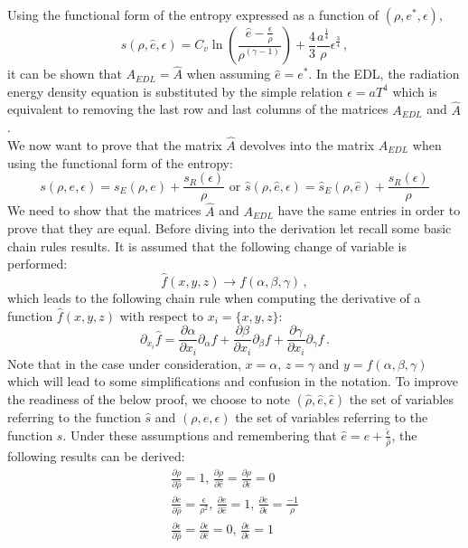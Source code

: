 \documentclass[times,doublespace]{fldauth}%
\begin{document}
Using the functional form of the entropy expressed as a function of $(\rho, e^*, \epsilon)$, 
%
\begin{equation}
s(\rho, \hat{e}, \epsilon) = C_v \ln \left( \frac{\hat{e}-\frac{\epsilon}{\rho}}{\rho^(\gamma-1)} \right) + \frac{4}{3} \frac{a^\frac{1}{4}}{\rho} \epsilon^\frac{3}{4} \, ,
\end{equation}
%
it can be shown that $A_{EDL} = \hat{A}$ when assuming $\hat{e} = e^*$. In the EDL, the radiation energy density equation is substituted by the simple relation $\epsilon = a T^4$ which is equivalent to removing the last row and last columns of the matrices $A_{EDL}$ and $\hat{A}$.\\
%
We now want to prove that the matrix $\hat{A}$ devolves into the matrix $A_{EDL}$ when using the functional form of the entropy:
%
\begin{equation}
s(\rho,e ,\epsilon) = s_E ( \rho ,e) + \frac{s_R(\epsilon)}{\rho} \text{ or }  \hat{s}(\rho,\hat{e} ,\epsilon) = \hat{s}_E ( \rho ,\hat{e}) + \frac{s_R(\epsilon)}{\rho}
\end{equation}
%
We need to show that the matrices $\hat{A}$ and $A_{EDL}$ have the same entries in order to prove that they are equal. Before diving into the derivation let recall some basic chain rules results. It is assumed that the following change of variable is performed:
%
\begin{equation}
\hat{f}(x,y,z) \rightarrow f(\alpha, \beta, \gamma) \nonumber \, ,
\end{equation}
%
which leads to the following chain rule when computing the derivative of a function $\hat{f}(x,y,z)$ with respect to $x_i = \{x,y,z \}$:
%
\begin{equation}\label{eq:chain_rule_chge_var}
\partial_{x_i} \hat{f} = \frac{\partial \alpha}{\partial x_i} \partial_\alpha f + \frac{\partial \beta}{\partial x_i} \partial_\beta f + \frac{\partial \gamma}{\partial x_i} \partial_\gamma f \, .
\end{equation}
%
Note that in the case under consideration, $x=\alpha$, $z=\gamma$ and $y=f(\alpha, \beta, \gamma)$ which will lead to some simplifications and confusion in the notation. To improve the readiness of the below proof, we choose to note $(\hat{\rho}, \hat{e}, \hat{\epsilon})$ the set of variables referring to the function $\hat{s}$ and $(\rho,e,\epsilon)$ the set of variables referring to the function $s$. Under these assumptions and remembering that $\hat{e} = e + \frac{\hat{\epsilon}}{\hat{\rho}}$, the following results can be derived:
%
\begin{eqnarray}
\frac{\partial \rho}{\partial \hat{\rho}} = 1 \text{, } \frac{\partial \rho}{\partial \hat{e}} = \frac{\partial \rho}{\partial \hat{\epsilon}} = 0 \nonumber \\
\frac{\partial e}{\partial \hat{\rho}} = \frac{\epsilon}{\rho^2} \text{, } \frac{\partial e}{\partial \hat{e}} = 1 \text{, } \frac{\partial e}{\partial \hat{\epsilon}} = \frac{-1}{\rho} \nonumber \\
\frac{\partial \epsilon}{\partial \hat{\rho}} = \frac{\partial \epsilon}{\partial \hat{e}} = 0 \text{, } \frac{\partial \epsilon}{\partial \hat{\epsilon}} = 1 \nonumber
\end{eqnarray}
\end{document}
